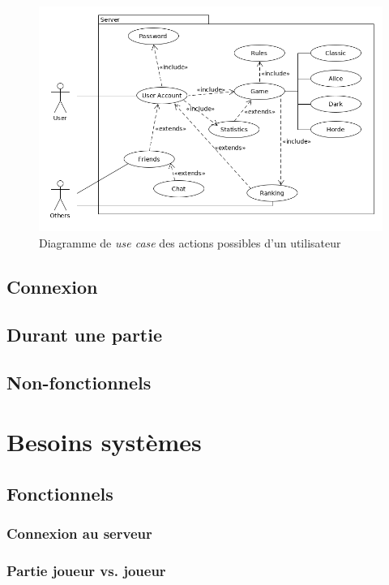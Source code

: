 \documentclass[10pt, a4paper]{article}
\begin{document}
\begin{figure}[h]
\centering
\includegraphics[scale=0.4]{Use_Case.png}
\caption{Diagramme de \textit{use case} des actions possibles d'un utilisateur}
\label{UC_act} %
\end{figure}
		
		\subsection{Connexion}


		\subsection{Durant une partie}
		
		\subsection{Non-fonctionnels}
		
	\section{Besoins systèmes}
		\subsection{Fonctionnels}
		\subsubsection{Connexion au serveur}
		
		\subsubsection{Partie joueur vs. joueur}
		
\end{document}
